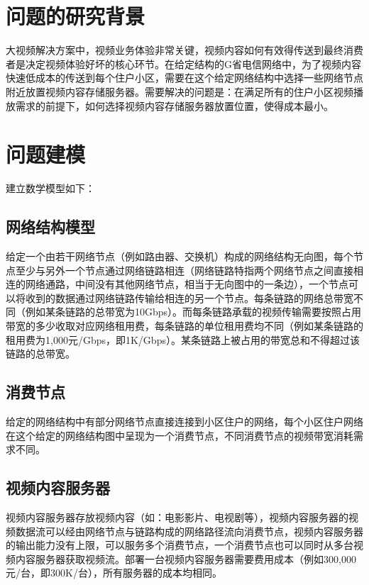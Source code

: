 \documentclass[a4paper,11pt,onecolumn,twoside]{article}
\begin{document}
\vspace{0.1cm}

\begin{multicols}{2}
\section{问题的研究背景}

大视频解决方案中，视频业务体验非常关键，视频内容如何有效得传送到最终消费者是决定视频体验好坏的核心环节。在给定结构的G省电信网络中，为了视频内容快速低成本的传送到每个住户小区，需要在这个给定网络结构中选择一些网络节点附近放置视频内容存储服务器。需要解决的问题是：在满足所有的住户小区视频播放需求的前提下，如何选择视频内容存储服务器放置位置，使得成本最小。

\section{问题建模}

建立数学模型如下：

\subsection{网络结构模型}
给定一个由若干网络节点（例如路由器、交换机）构成的网络结构无向图，每个节点至少与另外一个节点通过网络链路相连（网络链路特指两个网络节点之间直接相连的网络通路，中间没有其他网络节点，相当于无向图中的一条边），一个节点可以将收到的数据通过网络链路传输给相连的另一个节点。每条链路的网络总带宽不同（例如某条链路的总带宽为10Gbps）。而每条链路承载的视频传输需要按照占用带宽的多少收取对应网络租用费，每条链路的单位租用费均不同（例如某条链路的租用费为1,000元/Gbps，即1K/Gbps）。某条链路上被占用的带宽总和不得超过该链路的总带宽。

\subsection{消费节点}
给定的网络结构中有部分网络节点直接连接到小区住户的网络，每个小区住户网络在这个给定的网络结构图中呈现为一个消费节点，不同消费节点的视频带宽消耗需求不同。

\subsection{视频内容服务器}
视频内容服务器存放视频内容（如：电影影片、电视剧等），视频内容服务器的视频数据流可以经由网络节点与链路构成的网络路径流向消费节点，视频内容服务器的输出能力没有上限，可以服务多个消费节点，一个消费节点也可以同时从多台视频内容服务器获取视频流。部署一台视频内容服务器需要费用成本（例如300,000元/台，即300K/台），所有服务器的成本均相同。


\end{multicols}
\end{document}
